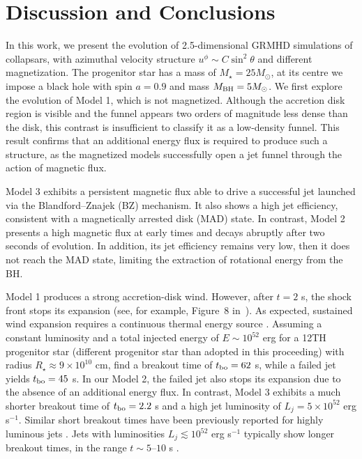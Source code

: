 \documentclass{ptapap}
\begin{document}
\section{Discussion and Conclusions}


In this work, we present the evolution of 2.5-dimensional GRMHD simulations of collapsars, with azimuthal velocity structure $u^\phi \sim C \sin^2\theta$ and different magnetization. The progenitor star has a mass of $M_\star = 25 M_\odot$, at its centre we impose a black hole with spin $a = 0.9$ and mass $M_{\rm BH} = 5 M_\odot$. We first explore the evolution of Model 1, which is not magnetized. Although the accretion disk region is visible and the funnel appears two orders of magnitude less dense than the disk, this contrast is insufficient to classify it as a low-density funnel. This result confirms that an additional energy flux is required to produce such a structure, as the magnetized models successfully open a jet funnel through the action of magnetic flux.

Model 3 exhibits a persistent magnetic flux able to drive a successful jet launched via the Blandford–Znajek (BZ) mechanism. It also shows a high jet efficiency, consistent with a magnetically arrested disk (MAD) state. In contrast, Model 2 presents a high magnetic flux at early times and decays abruptly after two seconds of evolution. In addition, its jet efficiency remains very low, then it does not reach the MAD state, limiting the extraction of rotational energy from the BH.


Model 1 produces a strong accretion-disk wind. However, after $t = 2$ s, the shock front stops its expansion (see, for example, Figure~8 in~\citet{urrutia2025}). As expected, sustained wind expansion requires a continuous thermal energy source \citep[e.g.,][]{Crosato2024,Crosato2025}. Assuming a constant luminosity and a total injected energy of $E \sim 10^{52}$ erg for a 12TH progenitor star (different progenitor star than adopted in this proceeding) with radius $R_\star \approx 9 \times 10^{10}$ cm, \citet{Urrutia2023Gws} find a breakout time of $t_{\rm bo} = 62$ s, while a failed jet yields $t_{\rm bo} = 45$ s.  In our Model 2, the failed jet also stops its expansion due to the absence of an additional energy flux. In contrast, Model 3 exhibits a much shorter breakout time of $t_{\rm bo} = 2.2$ s and a high jet luminosity of $L_j = 5 \times 10^{52}$ erg s$^{-1}$. Similar short breakout times have been previously reported for highly luminous jets \citep[e.g.,][]{Hamidani2017,Urrutia2023Gws}. Jets with luminosities $L_j \lesssim 10^{52}$ erg s$^{-1}$ typically show longer breakout times, in the range $t \sim 5$–$10$ s \citep[e.g.,][]{lopezcamara2009,lopezcamara2016,Hamidani2017,harrison18,Hamidani2021-expanding,Suzuki2022,urrutia22_3D,Pais2023collapsars}.
\end{document}
